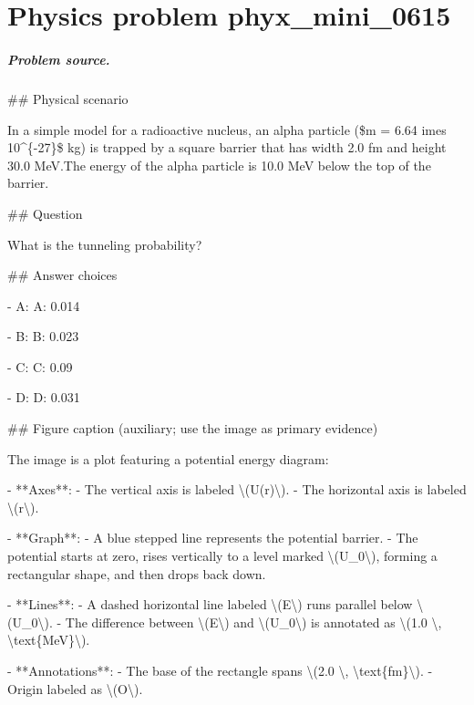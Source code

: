 
\chapter{Physics problem phyx\_mini\_0615}
\label{ch:PhyXMiniProblems_problem_phyx_mini_0615}

\paragraph{Problem source.}
\#\# Physical scenario

In a simple model for a radioactive nucleus, an alpha particle (\$m = 6.64 	imes 10\textasciicircum{}\{-27\}\$ kg) is trapped by a square barrier that has width 2.0 fm and height 30.0 MeV.The energy of the alpha particle is 10.0 MeV below the top of the barrier.

\#\# Question

What is the tunneling probability?

\#\# Answer choices

- A: A: 0.014

- B: B: 0.023

- C: C: 0.09

- D: D: 0.031

\#\# Figure caption (auxiliary; use the image as primary evidence)

The image is a plot featuring a potential energy diagram:

- **Axes**: 
  - The vertical axis is labeled \textbackslash{}(U(r)\textbackslash{}).
  - The horizontal axis is labeled \textbackslash{}(r\textbackslash{}).

- **Graph**:
  - A blue stepped line represents the potential barrier.
  - The potential starts at zero, rises vertically to a level marked \textbackslash{}(U\_0\textbackslash{}), forming a rectangular shape, and then drops back down.

- **Lines**:
  - A dashed horizontal line labeled \textbackslash{}(E\textbackslash{}) runs parallel below \textbackslash{}(U\_0\textbackslash{}).
  - The difference between \textbackslash{}(E\textbackslash{}) and \textbackslash{}(U\_0\textbackslash{}) is annotated as \textbackslash{}(1.0 \textbackslash{}, \textbackslash{}text\{MeV\}\textbackslash{}).

- **Annotations**:
  - The base of the rectangle spans \textbackslash{}(2.0 \textbackslash{}, \textbackslash{}text\{fm\}\textbackslash{}).
  - Origin labeled as \textbackslash{}(O\textbackslash{}).

